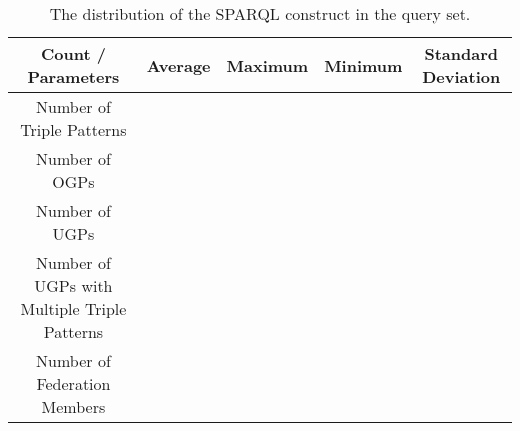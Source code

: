 \begin{table}
    \begin{center}
        \begin{tabular}{|*{5}{c|}}
        \hline
        Count / Parameters & Average & Maximum & Minimum & Standard Deviation \\ 
        \hline \hline
        Number of Triple Patterns & {} & {} & {} & {} \\ 
        \hline
        Number of OGPs & {} & {} & {} & {} \\ 
        \hline
        Number of UGPs & {} & {} & {} & {} \\ 
        \hline
        Number of UGPs with Multiple Triple Patterns & {} & {} & {} & {} \\ 
        \hline
        Number of Federation Members & {} & {} & {} & {} \\  
        \hline
        \end{tabular}
    \end{center}
    \caption{
        The distribution of the SPARQL construct in the query set.
    }
    \label{tab:statQuery}
\end{table}